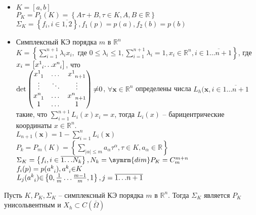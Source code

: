 \documentclass[__main__.tex]{subfiles}
\begin{document}
\begin{itemize}
	\item \(K=[a,b]\)\\
	      \(P_K=P_1(K)=\left\{A\tau+B,\tau{\in}K,A,B\in\mathbb{R}\right\}\)\\
	      \(\Sigma_K=\left\{f_i,i\in\overline{1,2}\right\},f_1(p)=p(a),f_2(b)=p(b)\)
	\item Симплексный КЭ порядка \(m\) в \(\mathbb{R}^n\)\\
	      \(K=\left\{\sum_{i=1}^{n+1}\lambda_i{x_i},\text{ где }0\le\lambda_i\le{1},\sum_{i=1}^{n+1}\lambda_i=1,x_i\in\mathbb{R}^n,i\in\overline{1\dots{n+1}}\right\}\), где \(x_i=\left[x\indices{^1_i}{\dots}x\indices{^n_i}\right]\), что\\
        \(\mathrm{det}\left(\begin{matrix} x\indices{^1_1}& \dots & x\indices{^1_{n+1}} \\ \vdots & \ddots & \vdots \\ x\indices{^n_1} & \dots & x\indices{^n_{n+1}} \\ 1 & \dots & 1 \end{matrix}\right){\neq}0\),
        \({\forall}\symbf{x}\in\mathbb{R}^n\) определены числа \(L_h(\symbf{x},i\in\overline{1{\dots}{n+1}}\) такие, что \(\sum_{i=1}^{n+1}L_i(x)x_i=x\), тогда \(L_i(x)\) -- барицентрические координаты \(x\in\mathbb{R}^n\).\\
        \(L_{n+1}(\symbf{x})=1-\sum_{i=1}^{n}L_i(\symbf{x})\)\\
        \(P_k=P_m(K)=\left\{\sum_{ |\alpha|{\le}m }a_\alpha\tau^\alpha,\tau{\in}K,a_\alpha\in\mathbb{R}\right\}\)\\
        \(\Sigma_K=\left\{f_i,i\in\overline{1{\dots}N_k}\right\}, N_k=\symrm{dim}P_K=C^{m+n}_m\)\\
        \(f_i(p)=p(a\indices{^k_i}),a\indices{^k_i}{\in}K\)\\
        \(L_j(a\indices{^k_i}){\in}\left\{0,\frac{1}{m}\dots\frac{m-1}{m},1\right\}, j=\overline{1{\dots}n+1}\)
\end{itemize}

\begin{theorem}
  Пусть \(K,P_K,\Sigma_K\) -- симплексный КЭ порядка \(m\) в \(\mathbb{R}^n\). Тогда \(\Sigma_K\) является \(P_K\) унисольвентным и \(X_h{\subset}C(\bar{\Omega})\)
\end{theorem}
\end{document}
